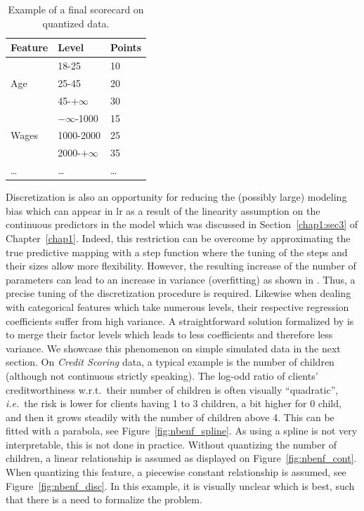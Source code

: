 \begin{table}
\centering
\caption{\label{tab:ex_scorecard} Example of a final scorecard on quantized data.}
\begin{tabular}{p{3cm}|p{3cm}|p{2cm}}
Feature & Level & Points \\
\hline
\hline
\multirow{3}{*}{Age} & 18-25 & 10 \\
 & 25-45 & 20 \\
 & 45-$+\infty$ & 30 \\
 \hline
\multirow{3}{*}{Wages} & $-\infty$-1000 & 15 \\
 & 1000-2000 & 25 \\
 & 2000-$+\infty$ & 35 \\
 \dots & \dots & \dots \\
\end{tabular}
\end{table}


Discretization is also an opportunity for reducing the (possibly large) modeling bias which can appear in \gls{lr} as a result of the linearity assumption on the continuous predictors in the model which was discussed in Section~\ref{chap1:sec3} of Chapter~\ref{chap1}. Indeed, this restriction can be overcome by approximating the true predictive mapping with a step function where the tuning of the steps and their sizes allow more flexibility. However, the resulting increase of the number of parameters can lead to an increase in variance (overfitting) as shown in \cite{yang2009discretization}. Thus, a precise tuning of the discretization procedure is required. Likewise when dealing with categorical features which take numerous levels, their respective regression coefficients suffer from high variance. A straightforward solution formalized by \cite{maj2015delete} is to merge their factor levels which leads to less coefficients and therefore less variance. We showcase this phenomenon on simple simulated data in the next section. On \textit{Credit Scoring} data, a typical example is the number of children (although not continuous strictly speaking). The log-odd ratio of clients' creditworthiness w.r.t.\ their number of children is often visually ``quadratic'', \textit{i.e.}\ the risk is lower for clients having 1 to 3 children, a bit higher for 0 child, and then it grows steadily with the number of children above 4. This can be fitted with a parabola, see Figure~\ref{fig:nbenf_spline}. As using a spline is not very interpretable, this is not done in practice. Without quantizing the number of children, a linear relationship is assumed as displayed on Figure~\ref{fig:nbenf_cont}. When quantizing this feature, a piecewise constant relationship is assumed, see Figure~\ref{fig:nbenf_disc}. In this example, it is visually unclear which is best, such that there is a need to formalize the problem.

